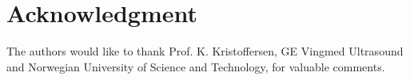 \documentclass[journal]{IEEEtran}
\begin{document}






%





\section*{Acknowledgment}
The authors would like to thank Prof. K. Kristoffersen, GE Vingmed Ultrasound and Norwegian University of Science and Technology, for valuable comments. 
\end{document}
